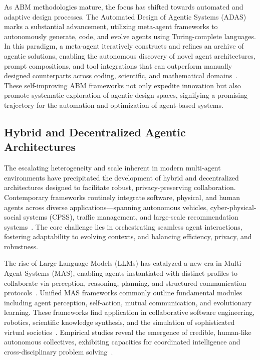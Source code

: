As ABM methodologies mature, the focus has shifted towards automated and adaptive design processes. The Automated Design of Agentic Systems (ADAS) marks a substantial advancement, utilizing meta-agent frameworks to autonomously generate, code, and evolve agents using Turing-complete languages. In this paradigm, a meta-agent iteratively constructs and refines an archive of agentic solutions, enabling the autonomous discovery of novel agent architectures, prompt compositions, and tool integrations that can outperform manually designed counterparts across coding, scientific, and mathematical domains~\cite{ref103}. These self-improving ABM frameworks not only expedite innovation but also promote systematic exploration of agentic design spaces, signifying a promising trajectory for the automation and optimization of agent-based systems.

\subsection{Hybrid and Decentralized Agentic Architectures}

The escalating heterogeneity and scale inherent in modern multi-agent environments have precipitated the development of hybrid and decentralized architectures designed to facilitate robust, privacy-preserving collaboration. Contemporary frameworks routinely integrate software, physical, and human agents across diverse applications—spanning autonomous vehicles, cyber-physical-social systems (CPSS), traffic management, and large-scale recommendation systems~\cite{ref13,ref22,ref25,ref26,ref27,ref41,ref42,ref43,ref44,ref54,ref55,ref56,ref60,ref69,ref70,ref83,ref85,ref101}. The core challenge lies in orchestrating seamless agent interactions, fostering adaptability to evolving contexts, and balancing efficiency, privacy, and robustness.

The rise of Large Language Models (LLMs) has catalyzed a new era in Multi-Agent Systems (MAS), enabling agents instantiated with distinct profiles to collaborate via perception, reasoning, planning, and structured communication protocols~\cite{ref101,ref105,ref106}. Unified MAS frameworks commonly outline fundamental modules including agent perception, self-action, mutual communication, and evolutionary learning. These frameworks find application in collaborative software engineering, robotics, scientific knowledge synthesis, and the simulation of sophisticated virtual societies~\cite{ref101,ref105}. Empirical studies reveal the emergence of credible, human-like autonomous collectives, exhibiting capacities for coordinated intelligence and cross-disciplinary problem solving~\cite{ref101}.

